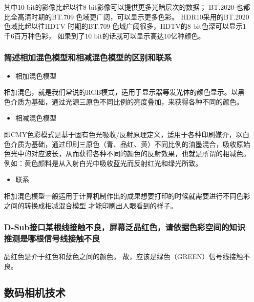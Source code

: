 \documentclass[UTF8,a4paper,AutoFakeBold,AutoFakeSlant]{ctexart}
\begin{document}
其中10 bit的影像比起以往8 bit影像可以提供更多光暗层次的数据；
BT.2020 也都比全高清时期的BT.709 色域更广阔，可以显示更多色彩。
HDR10采用的BT.2020 色域比起以往HDTV 时期的BT.709 色域广阔很多，HDTV的8 bit色深可以显示1千6百万种色彩，
如果到了10 bit的话就可以显示高达10亿种颜色。



\subsubsection{简述相加混色模型和相减混色模型的区别和联系}

\begin{itemize}
  \item 相加混色模型
\end{itemize}

相加混色，就是我们常说的RGB模式，适用于显示器等发光体的颜色显示。以黑色介质为基础，通过光源三原色不同比例的亮度叠加，来获得各种不同的颜色。

\begin{itemize}
  \item 相减混色模型
\end{itemize}

即CMY色彩模式是基于固有色光吸收/反射原理定义，适用于各种印刷媒介，以白色介质为基础，通过印刷三原色（青、品红、黄）不同比例的油墨混合，吸收原始色光中的对应波长，从而获得各种不同的颜色的反射效果，也就是所谓的相减色。例如：黄色颜料是从入射白光中吸收蓝光而反射红光和绿光所致。

\begin{itemize}
  \item 联系
\end{itemize}

相加混色模型一般运用于计算机制作出的成果想要打印的时候就需要进行不同色彩之间的转换成相减混合模型
才能印刷出人眼看到的样子。



\subsubsection{D-Sub接口某根线接触不良，屏幕泛品红色，请依据色彩空间的知识推测是哪根信号线接触不良}

品红色是介于红色和蓝色之间的颜色。
故，应该是绿色（GREEN）信号线接触不良。




\subsection{数码相机技术}
\end{document}
